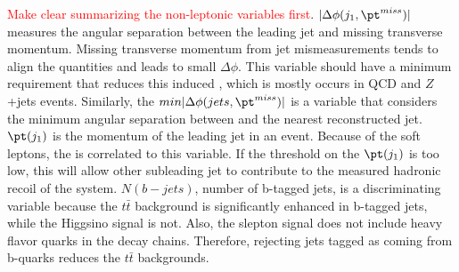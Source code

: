 \textcolor{red}{Make clear summarizing the non-leptonic variables first}. $|\Delta\phi(j_1, \pt^{miss})|$ measures the angular separation between the leading jet and missing transverse momentum.  Missing transverse momentum from jet mismeasurements tends to align the quantities and leads to small $\Delta\phi$.  This variable should have a minimum requirement that reduces this induced \met{}, which is mostly occurs in QCD and $Z$+jets events.  Similarly, the $min|\Delta\phi(jets, \pt^{miss})|$ is a variable that considers the minimum angular separation between \met{} and the nearest reconstructed jet.  $\pt(j_1)$ is the momentum of the leading jet in an event.  Because of the soft leptons, the \met{} is correlated to this variable.  If the threshold on the $\pt(j_1)$ is too low, this will allow other subleading jet to contribute to the measured hadronic recoil of the system.  $N(b-jets)$, number of b-tagged jets, is a discriminating variable because the $t\bar{t}$ background is significantly enhanced in b-tagged jets, while the Higgsino signal is not.   Also, the slepton signal does not include heavy flavor quarks in the decay chains.  Therefore, rejecting jets tagged as coming from b-quarks reduces the $t\bar{t}$ backgrounds.

